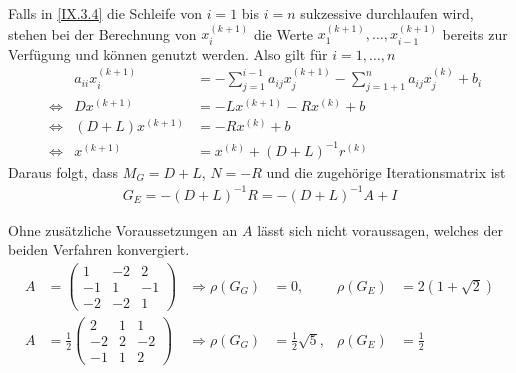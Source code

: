 Falls in \eqref{IX.3.4} die Schleife von $i=1$ bis $i=n$
sukzessive durchlaufen wird, stehen bei der Berechnung von
$x_i^{(k+1)}$ die Werte $x_1^{(k+1)},\dotsc,x_{i-1}^{(k+1)}$
bereits zur Verfügung und können genutzt werden.
Also gilt für $i=1,\dotsc,n$
\begin{align}
  &&a_{ii}x_i^{(k+1)} & = -\sum_{j=1}^{i-1}a_{ij}x_j^{(k+1)}
                        -\sum_{j=1+1}^{n}a_{ij}x_j^{(k)}+ b_i
                        \label{IX.3.5} \\\nonumber
  &\Longleftrightarrow &Dx^{(k+1)}&=-Lx^{(k+1)}-Rx^{(k)}+b \\
  &\Longleftrightarrow &(D+L)x^{(k+1)}&=-Rx^{(k)}+b
                                        \label{IX.3.6} \\\nonumber
  &\Longleftrightarrow &x^{(k+1)} &= x^{(k)}+(D+L)^{-1}r^{(k)}
\end{align}
Daraus folgt, dass $M_G=D+L$, $N=-R$ 
und die zugehörige Iterationsmatrix ist 
\begin{gather*}
  G_E = -(D+L)^{-1}R = -(D+L)^{-1}A+I
\end{gather*}

\begin{Bspe}
  Ohne zusätzliche Voraussetzungen an $A$ lässt sich
  nicht voraussagen, welches der beiden Verfahren konvergiert.
  \begin{align*}
    A&= \begin{pmatrix}
      1&-2&2\\
      -1&1&-1\\
      -2&-2&1
    \end{pmatrix}
          &\Longrightarrow \rho(G_G)&=0, &\rho(G_E)&=2(1+\sqrt{2})\\
    A&= \frac{1}{2}\begin{pmatrix}
      2&1&1\\
      -2&2&-2\\
      -1&1&2
    \end{pmatrix}
          &\Longrightarrow \rho(G_G)&=\frac{1}{2}\sqrt{5}, &\rho(G_E)&=\frac{1}{2}
  \end{align*}
\end{Bspe}

